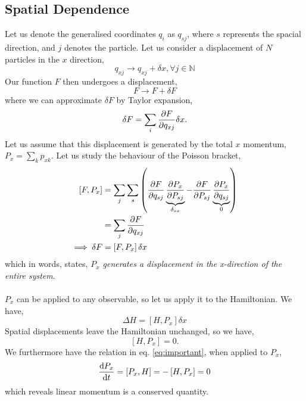 \documentclass{book}
\begin{document}
\subsection{Spatial Dependence}
Let us denote the generalised coordinates $q_i$ as $q_{sj}$, where $s$ represents the spacial direction, and $j$ denotes the particle. Let us consider a displacement of $N$ particles in the $x$ direction,
\begin{equation}
	q_{xj} \to q_{xj} + \delta x, \forall j \in \mathbb{N}
\end{equation}
Our function $F$ then undergoes a displacement,
\begin{equation}
	F \to F + \delta F
\end{equation}
where we can approximate $\delta F$ by Taylor expansion,
\begin{equation}
	\delta F = \sum_i \pdv{F}{q_{xj}}\delta x.
\end{equation}
Let us assume that this displacement is generated by the total $x$ momentum, $P_x = \sum_k p_{xk}$. Let us study the behaviour of the Poisson bracket,
\begin{equation}
	\begin{split}
		\left[F,P_x\right] & = \sum_j\sum_s\left(\pdv{F}{q_{sj}}\underbrace{\pdv{P_x}{P_{sj}}}_{\delta_{sx}} - \pdv{F}{P_{sj}}\underbrace{\pdv{P_x}{q_{sj}}}_0\right) \\
		& = \sum_j \pdv{F}{q_{xj}} \\
		\implies \delta F & = \left[F,P_x\right]\delta x
	\end{split}
\end{equation}
which in words, states, \textit{$P_x$ generates a displacement in the x-direction of the entire system}.
\\\\
$P_x$ can be applied to any observable, so let us apply it to the Hamiltonian. We have,
\begin{equation}
	\Delta H = \left[H, P_x\right]\delta x
\end{equation}
Spatial displacements leave the Hamiltonian unchanged, so we have,
\begin{equation}
	\left[H, P_x\right] = 0.
\end{equation}
We furthermore have the relation in eq. \eqref{eq:important}, when applied to $P_x$,
\begin{equation}
	\dv{P_x}{t} = \left[P_x, H\right] = -\left[H,P_x\right] = 0
\end{equation}
which reveals linear momentum is a conserved quantity.
\end{document}
